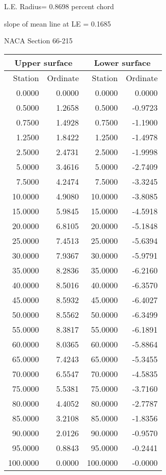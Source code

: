 \documentclass[11pt]{book}
\begin{document}
L.E. Radius=  0.8698 percent chord


 slope of mean line at LE =  0.1685
 \newpage
  \label{s66-215}
 \begin{Large}
 NACA Section 66-215
 \end{Large}
  
 \vspace{8mm}
 \begin{tabular}{|r|r|r|r|} \hline 
 \multicolumn{2}{|c|}{Upper surface} & \multicolumn{2}{|c|}{Lower surface} \\
 \hline
 Station & Ordinate & Station & Ordinate \\
 \hline
0.0000 & 0.0000 & 0.0000 & 0.0000 \\
0.5000 & 1.2658 & 0.5000 & -0.9723 \\
0.7500 & 1.4928 & 0.7500 & -1.1900 \\
1.2500 & 1.8422 & 1.2500 & -1.4978 \\
2.5000 & 2.4731 & 2.5000 & -1.9998 \\
5.0000 & 3.4616 & 5.0000 & -2.7409 \\
7.5000 & 4.2474 & 7.5000 & -3.3245 \\
10.0000 & 4.9080 & 10.0000 & -3.8085 \\
15.0000 & 5.9845 & 15.0000 & -4.5918 \\
20.0000 & 6.8105 & 20.0000 & -5.1848 \\
25.0000 & 7.4513 & 25.0000 & -5.6394 \\
30.0000 & 7.9367 & 30.0000 & -5.9791 \\
35.0000 & 8.2836 & 35.0000 & -6.2160 \\
40.0000 & 8.5016 & 40.0000 & -6.3570 \\
45.0000 & 8.5932 & 45.0000 & -6.4027 \\
50.0000 & 8.5562 & 50.0000 & -6.3499 \\
55.0000 & 8.3817 & 55.0000 & -6.1891 \\
60.0000 & 8.0365 & 60.0000 & -5.8864 \\
65.0000 & 7.4243 & 65.0000 & -5.3455 \\
70.0000 & 6.5547 & 70.0000 & -4.5835 \\
75.0000 & 5.5381 & 75.0000 & -3.7160 \\
80.0000 & 4.4052 & 80.0000 & -2.7787 \\
85.0000 & 3.2108 & 85.0000 & -1.8356 \\
90.0000 & 2.0126 & 90.0000 & -0.9570 \\
95.0000 & 0.8843 & 95.0000 & -0.2441 \\
100.0000 & 0.0000 & 100.0000 & -0.0000 \\
 \hline 
 \end{tabular}
\end{document}

